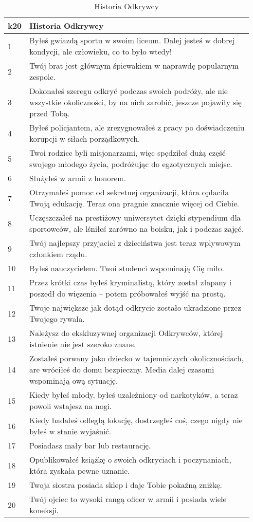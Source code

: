  \begin{table*}[t]
 \centering
 \begin{tabularx}{\textwidth}{| p{} | X |}
  \hline
  \textbf{k20} & \textbf{Historia Odkrywcy}  \\ \hline
    1 & Byłeś gwiazdą sportu w swoim liceum. Dalej jesteś w dobrej kondycji, ale człowieku, co to było wtedy! \\ \hline
    2 & Twój brat jest głównym śpiewakiem w naprawdę popularnym zespole. \\ \hline
    3 & Dokonałeś szeregu odkryć podczas swoich podróży, ale nie wszystkie okoliczności, by na nich zarobić, jeszcze pojawiły się przed Tobą. \\ \hline
    4 & Byłeś policjantem, ale zrezygnowałeś z pracy po doświadczeniu korupcji w siłach porządkowych. \\ \hline
    5 & Twoi rodzice byli misjonarzami, więc spędziłeś dużą część swojego młodego życia, podróżując do egzotycznych miejsc.  \\ \hline
    6 & Służyłeś w armii z honorem. \\ \hline
    7 & Otrzymałeś pomoc od sekretnej organizacji, która opłaciła Twoją edukację. Teraz ona pragnie znacznie więcej od Ciebie.  \\ \hline
    8 & Uczęszczałeś na prestiżowy uniwersytet dzięki stypendium dla sportowców, ale lśniłeś zarówno na boisku, jak i podczas zajęć.  \\ \hline
    9 & Twój najlepszy przyjaciel z dzieciństwa jest teraz wplywowym członkiem rządu. \\ \hline
    10 & Byłeś nauczycielem. Twoi studenci wspominają Cię miło. \\ \hline
    11 & Przez krótki czas byłeś kryminalistą, który został złapany i poszedł do więzenia – potem próbowałeś wyjść na prostą. \\ \hline
    12 & Twoje największe jak dotąd odkrycie zostało ukradzione przez Twojego rywala.  \\ \hline
    13 & Należysz do ekskluzywnej organizacji Odkrywców, której istnienie nie jest szeroko znane. \\ \hline
    14 & Zostałeś porwany jako dziecko w tajemniczych okolicznościach, are wróciłeś do domu bezpieczny. Media dalej czasami wspominają ową sytuację.  \\ \hline
    15 & Kiedy byłeś młody, byłeś uzależniony od narkotyków, a teraz powoli wstajesz na nogi. \\ \hline
    16 & Kiedy badałeś odległą lokację, dostrzegłeś coś, czego nigdy nie byłeś w stanie wyjaśnić. \\ \hline
    17 & Posiadasz mały bar lub restaurację. \\ \hline
    18 & Opublikowałeś książkę o swoich odkryciach i poczynaniach, która zyskała pewne uznanie. \\ \hline
    19 & Twoja siostra posiada sklep i daje Tobie pokaźną zniżkę. \\ \hline
    20 & Twój ojciec to wysoki rangą oficer w armii i posiada wiele koneksji. \\ \hline
 \end{tabularx}
  \caption {Historia Odkrywcy}
  \label {Historia Odkrywcy}
 \end{table*}